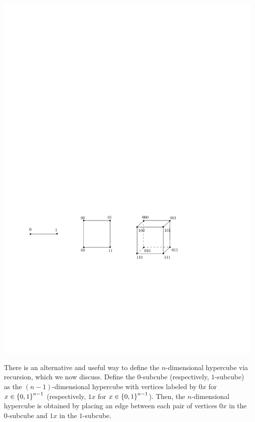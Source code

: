 \documentclass[11pt]{article}
\begin{document}
\begin{center}
\includegraphics[scale=0.8]{hypercube.pdf}
\end{center}

There is an alternative and useful way to define the $n$-dimensional hypercube via recursion, which we now discuss. Define the $0$-subcube (respectively, $1$-subcube)  as the $(n-1)$-dimensional hypercube with vertices labeled by $0x$ for $x\in{\left\{0,1\right\}}^{n-1}$ (respectively, $1x$ for $x\in{\left\{0,1\right\}}^{n-1}$). Then, the $n$-dimensional hypercube is obtained by placing an edge between each pair of vertices $0x$ in the $0$-subcube and $1x$ in the $1$-subcube.

\vspace{-2mm}
\end{document}
